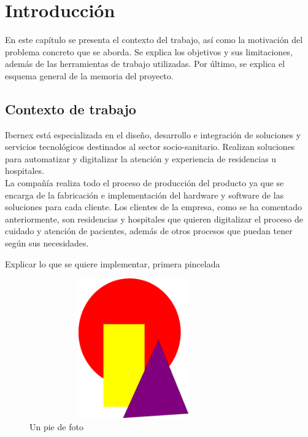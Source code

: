 \chapter{Introducción}
\label{ch:no_lineal}

En este capítulo se presenta el contexto del trabajo, así como la motivación del problema concreto que se aborda. Se explica los objetivos y sus limitaciones, además de las herramientas de trabajo utilizadas. Por último, se explica el esquema general de la memoria del proyecto.

\section{Contexto de trabajo}


 Ibernex está especializada en el diseño, desarrollo e integración de soluciones y servicios tecnológicos destinados al sector socio-sanitario.
 Realizan soluciones para automatizar y digitalizar la atención y experiencia de residencias u hospitales. \\


 La compañía realiza todo el proceso de producción del producto ya que se encarga de la fabricación e implementación del hardware y software de las soluciones para cada cliente.
 Los clientes de la empresa, como se ha comentado anteriormente, son residencias y hospitales que quieren digitalizar el proceso de cuidado y atención de pacientes, además de otros procesos que puedan tener según sus necesidades. \newline

Explicar lo que se quiere implementar, primera pincelada

\begin{figure}[!h]
    \centering
    \includegraphics[width=0.8\textwidth,height=6cm]{Imagenes/Arte_abstracto}
    \caption{Un pie de foto}
    \label{fig:una_etiqueta}
\end{figure}




